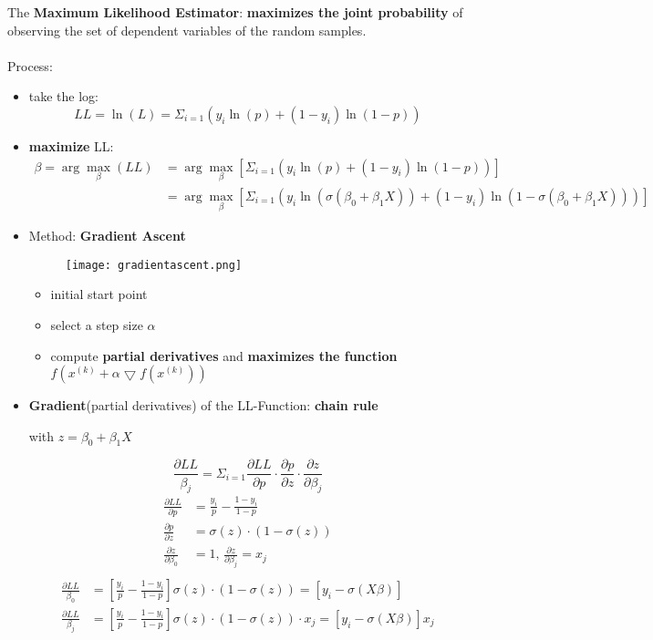 The \textbf{Maximum Likelihood Estimator}: \textbf{maximizes the joint probability} of observing the set of dependent variables of the random samples.
\\ \ \\
Process:
\begin{itemize}
	\item take the log: $$LL = \ln(L) = \Sigma_{i=1} ( y_{i} \ln(p) + (1 - y_i)\ln(1-p))$$
	\item \textbf{maximize} LL: 
	\begin{align*}
		\beta = \arg\max_{\beta}(LL) &= \arg\max_{\beta} [\Sigma_{i=1} ( y_{i} \ln(p) + (1 - y_i)\ln(1-p))] \\
									 &= \arg\max_{\beta} [\Sigma_{i=1} ( y_{i} \ln(\sigma(\beta_0+\beta_1X)) + (1 - y_i)\ln(1-\sigma(\beta_0 + \beta_1X)))]
	\end{align*}
	\item Method: \textbf{Gradient Ascent}
	\begin{figure}[H]
		\centering
		\texttt{[image: gradientascent.png]}
	\end{figure}
	\begin{itemize}
		\item initial start point
		\item select a step size $\alpha$
		\item compute \textbf{partial derivatives} and \textbf{maximizes the function} $f(x^{(k)} + \alpha \bigtriangledown f(x^{(k)}))$
	\end{itemize}
	\item \textbf{Gradient}(partial derivatives) of the LL-Function: \textbf{chain rule}
	
	 with $z = \beta_0+\beta_1X$
	
	$$\frac{\partial LL}{\beta_j} = \Sigma_{i=1} \frac{\partial LL}{\partial p} \cdot \frac{\partial p}{\partial z} \cdot \frac{\partial z}{\partial \beta_j}$$
	\begin{align*}
		\frac{\partial LL}{\partial p} &= \frac{y_i}{p} - \frac{1 - y_i}{1 - p} \\
		 \frac{\partial p}{\partial z} &= \sigma(z) \cdot(1 - \sigma(z)) \\
		 \frac{\partial z}{\partial \beta_0} &= 1 \text{, } \frac{\partial z}{\partial \beta_j} = x_j\\		 
	\end{align*}
	\begin{align*}
		\frac{\partial LL}{\beta_0} &= \left[ \frac{y_i}{p} - \frac{1 - y_i}{1 - p}\right]  \sigma(z) \cdot(1 - \sigma(z)) = \left[ y_i - \sigma(X\beta) \right] \\
		\frac{\partial LL}{\beta_j} &= \left[ \frac{y_i}{p} - \frac{1 - y_i}{1 - p}\right]  \sigma(z) \cdot(1 - \sigma(z))\cdot x_j = \left[ y_i - \sigma(X\beta) \right] x_j
	\end{align*}
\end{itemize}
